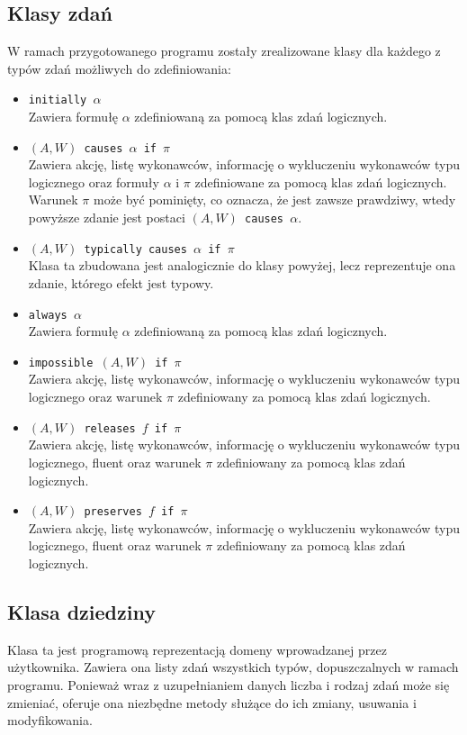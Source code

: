 \documentclass{article}
\begin{document}
\subsection{Klasy zdań}
W ramach przygotowanego programu zostały zrealizowane klasy dla każdego z typów zdań możliwych do zdefiniowania:
\begin{itemize}
\item {\large\texttt{initially $\alpha$}}\\
Zawiera formułę $\alpha$ zdefiniowaną za pomocą klas zdań logicznych.
\item {\large\texttt{$(A,W)$ causes $\alpha$ if $\pi$}}\\
Zawiera akcję, listę wykonawców, informację o wykluczeniu wykonawców typu logicznego oraz formuły $\alpha$ i $\pi$ zdefiniowane za pomocą klas zdań logicznych. Warunek $\pi$ może być pominięty, co oznacza, że jest zawsze prawdziwy, wtedy powyższe zdanie jest postaci {\large\texttt{$(A,W)$ causes $\alpha$}}.
\item {\large\texttt{$(A,W)$ typically causes $\alpha$ if $\pi$}}\\
Klasa ta zbudowana jest analogicznie do klasy powyżej, lecz reprezentuje ona zdanie, którego efekt jest typowy.
\item {\large\texttt{always $\alpha$}}\\
Zawiera formułę $\alpha$ zdefiniowaną za pomocą klas zdań logicznych.
\item {\large\texttt{impossible $(A,W)$ if $\pi$}}\\
Zawiera akcję, listę wykonawców, informację o wykluczeniu wykonawców typu logicznego oraz warunek $\pi$ zdefiniowany za pomocą klas zdań logicznych. 
\item {\large\texttt{$(A,W)$ releases $f$ if $\pi$}}\\
Zawiera akcję, listę wykonawców, informację o wykluczeniu wykonawców typu logicznego, fluent oraz warunek $\pi$ zdefiniowany za pomocą klas zdań logicznych. 
\item {\large\texttt{$(A,W)$ preserves $f$ if $\pi$}}\\
Zawiera akcję, listę wykonawców, informację o wykluczeniu wykonawców typu logicznego, fluent oraz warunek $\pi$ zdefiniowany za pomocą klas zdań logicznych.
\end{itemize}

\subsection{Klasa dziedziny}
Klasa ta jest programową reprezentacją domeny wprowadzanej przez użytkownika. Zawiera ona listy zdań wszystkich typów, dopuszczalnych w ramach programu. Ponieważ wraz z uzupełnianiem danych liczba i rodzaj zdań może się zmieniać, oferuje ona niezbędne metody służące do ich zmiany, usuwania i modyfikowania.
\end{document}
